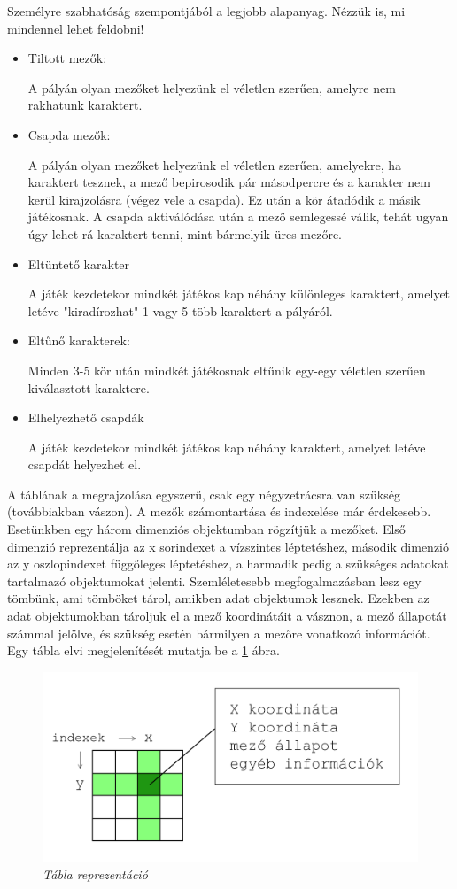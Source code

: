 Személyre szabhatóság szempontjából a legjobb alapanyag. Nézzük is, mi mindennel lehet feldobni!
\begin{itemize}
	
	\item Tiltott mezők:
	
	A pályán olyan mezőket helyezünk el véletlen szerűen, amelyre nem rakhatunk karaktert.
	\item Csapda mezők:
	
	A pályán olyan mezőket helyezünk el véletlen szerűen, amelyekre, ha karaktert tesznek, a mező bepirosodik pár másodpercre és a karakter nem kerül kirajzolásra (végez vele a csapda). Ez után a kör átadódik a másik játékosnak. A csapda aktiválódása után a mező semlegessé válik, tehát ugyan úgy lehet rá karaktert tenni, mint bármelyik üres mezőre.
	\item Eltüntető karakter
	
	A játék kezdetekor mindkét játékos kap néhány különleges karaktert, amelyet letéve "kiradírozhat" 1 vagy 5 több karaktert a pályáról.
	\item Eltűnő karakterek:
	
	Minden 3-5 kör után mindkét játékosnak eltűnik egy-egy véletlen szerűen kiválasztott karaktere.	
	\item Elhelyezhető csapdák
	
	A játék kezdetekor mindkét játékos kap néhány karaktert, amelyet letéve csapdát helyezhet el.	
\end{itemize}

\label{board-repr}

A táblának a megrajzolása egyszerű, csak egy négyzetrácsra van szükség (továbbiakban vászon). A mezők számontartása és indexelése már érdekesebb. Esetünkben egy három dimenziós objektumban rögzítjük a mezőket. Első dimenzió reprezentálja az x sorindexet a vízszintes léptetéshez, második dimenzió az y oszlopindexet függőleges léptetéshez, a harmadik pedig a szükséges adatokat tartalmazó objektumokat jelenti. Szemléletesebb megfogalmazásban lesz egy tömbünk, ami tömböket tárol, amikben adat objektumok lesznek. Ezekben az adat objektumokban tároljuk el a mező koordinátáit a vásznon, a mező állapotát számmal jelölve, és szükség esetén bármilyen a mezőre vonatkozó információt. Egy tábla elvi megjelenítését mutatja be a \ref{fig:field-repr} ábra.

\begin{figure}[!h]
	\centering
	\includegraphics[width=0.6\linewidth]{kepek/field-representation.png}
	\caption{\textit{Tábla reprezentáció}}
	\label{fig:field-repr}
\end{figure}

